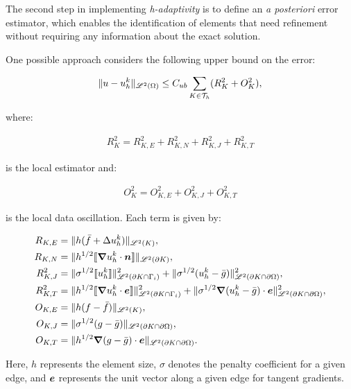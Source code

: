 The second step in implementing \textit{h-adaptivity} is to define an \textit{a posteriori} error estimator, which enables the identification of elements that need refinement without requiring any information about the exact solution.

\cite{Cangiani2023} One possible approach considers the following upper bound on the error:

\begin{gather}
	\lVert u - u^k_h \rVert_{\mathscr{L}^2(\Omega)} \leq C_{ub} \sum_{K \in \mathcal{T}_h} (R_K^2 + O_K^2),
\end{gather}

where:

\begin{gather}
	R_K^2 = R_{K, E}^2 + R_{K, N}^2 + R_{K, J}^2 + R_{K, T}^2
\end{gather}

is the local estimator and:

\begin{gather}
	O_K^2 = O_{K, E}^2 + O_{K, J}^2 + O_{K, T}^2
\end{gather}

is the local data oscillation. Each term is given by:

\begin{align}
	R_{K, E} &= \lVert h (\bar{f} + \Delta u^k_h) \rVert_{\mathscr{L}^2(K)}, \\
	R_{K, N} &= \lVert h^{1/2} \llbracket \bm{\nabla} u^k_h \cdot \bm{n} \rrbracket \rVert_{\mathscr{L}^2(\partial K)}, \\
	R^2_{K, J} &= \lVert \sigma^{1/2} \llbracket u^k_h \rrbracket \rVert^2_{\mathscr{L}^2(\partial K \cap \Gamma_{i})} + \lVert \sigma^{1/2} (u^k_h - \bar{g}) \rVert^2_{\mathscr{L}^2(\partial K \cap \partial \Omega)}, \\
	R^2_{K, T} &= \lVert h^{1/2} \llbracket \bm{\nabla} u^k_h \cdot \bm{e} \rrbracket \rVert^2_{\mathscr{L}^2(\partial K \cap \Gamma_{i})} + \lVert \sigma^{1/2} \bm{\nabla} (u^k_h - \bar{g}) \cdot \bm{e} \rVert^2_{\mathscr{L}^2(\partial K \cap \partial \Omega)}, \\
	O_{K, E} &= \lVert h (f - \bar{f}) \rVert_{\mathscr{L}^2(K)}, \\
	O_{K, J} &= \lVert \sigma^{1/2} (g - \bar{g}) \rVert_{\mathscr{L}^2(\partial K \cap \partial \Omega)}, \\
	O_{K, T} &= \lVert h^{1/2} \bm{\nabla} (g - \bar{g}) \cdot \bm{e} \rVert_{\mathscr{L}^2(\partial K \cap \partial \Omega)}.
\end{align}

Here, $h$ represents the element size, $\sigma$ denotes the penalty coefficient for a given edge, and $\bm{e}$ represents the unit vector along a given edge for tangent gradients.

